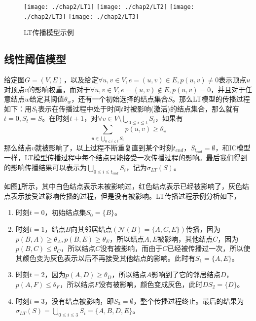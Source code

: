 \begin{figure}[H]
\centering%
	{\texttt{[image: ./chap2/LT1]}}
	\hspace{1mm}%
	{\texttt{[image: ./chap2/LT2]}}
	\hspace{1mm}%
	{\texttt{[image: ./chap2/LT3]}}
	\hspace{1mm}%
	{\texttt{[image: ./chap2/LT3]}}
	\caption{LT传播模型示例}
	\label{fig:LT-inf-diffusion}
\end{figure}


\subsection{线性阈值模型}
\label{sec:LT-model-desc}
给定图$G=(V, E)$，以及给定$\forall u, v \in V, e=(u, v) \in E, p(u, v) \neq 0$表示顶点$u$对顶点$v$的影响权重，而对于$\forall u, v \in V, e=(u, v) \notin E, p(u, v)=0$，并且对于任意结点$w$给定其阈值$\theta_{w}$，还有一个初始选择的结点集合$S$。那么LT模型的传播过程如下：用$S_{t}$表示在传播过程中处于时间$t$时被影响(激活)的结点集合，那么就有$t=0, S_{t}=S$。在时刻$t+1$，对$\forall v \in V\setminus \bigcup_{0 \leq i \leq t}S_{i}$，如果有
\begin{displaymath} 
	{\sum_{u \in \bigcup_{0 \leq i \leq t}S_{i}}p(u,v) \geq \theta_{v}} 
\end{displaymath}
那么结点$v$就被影响了，以上过程不断重复直到某个时刻$t_{end}$，$S_{t_{end}}=\emptyset$，和IC模型一样，LT模型传播过程中每个结点只能接受一次传播过程的影响。最后我们得到的影响传播结果可以表示为$\bigcup_{0 \leq i \leq t_{end}}S_{i}$，记为$\sigma_{LT}(S)$。


如图\ref{fig:LT-inf-diffusion}所示，其中白色结点表示未被影响过，红色结点表示已经被影响了，灰色结点表示接受过影响传播的过程，但是没有被影响。LT传播过程示例分析如下，
\begin{enumerate}
\item 时刻$t=0$，初始结点集$S_{0}=\{B\}$。
\item 时刻$t=1$，结点$B$向其邻居结点$(\mathcal{N}(B)=\{A, C, E\})$传播，因为$p(B,A) \geq \theta_{A}, p(B,E) \geq \theta_{E}$，所以结点$A, E$被影响，其他结点$C$，因为$p(B,C) \leq \theta_{C}$，所以结点$C$没有被影响，而由于$C$已经被传播过一次，所以使其颜色变为灰色表示以后不再接受其他结点的影响。此时有$S_{1}=\{A, E\}$。
\item 时刻$t=2$，因为$p(A,D) \geq \theta_{D}$，所以结点$A$影响到了它的邻居结点$D$，$p(A, F) \leq \theta_{F}$，所以结点$F$没有被影响，颜色变成灰色，此时$DS_{2}=\{D\}$。
\item 时刻$t=3$，没有结点被影响，即$S_{3}=\emptyset$，整个传播过程终止。最后的结果为$\sigma_{LT}(S)=\bigcup_{0 \leq i \leq 3}S_{i}=\{A, B, D, E\}$。
\end{enumerate}


